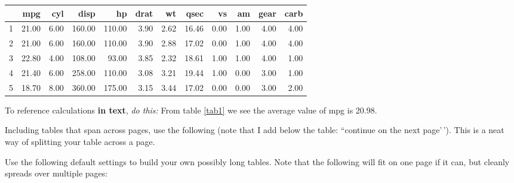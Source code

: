 \documentclass[12pt,preprint, authoryear]{elsarticle}
\let\origtable\table
\let\endorigtable\endtable
\renewenvironment{table}[1][2] {
    \expandafter\origtable\expandafter[H]
} {
    \endorigtable
}
\numberwithin{equation}{section}
\numberwithin{figure}{section}
\numberwithin{table}{section}
\begin{document}
\begin{table}[H]
\centering
\begin{tabular}{rrrrrrrrrrrr}
  \hline
 & mpg & cyl & disp & hp & drat & wt & qsec & vs & am & gear & carb \\ 
  \hline
1 & 21.00 & 6.00 & 160.00 & 110.00 & 3.90 & 2.62 & 16.46 & 0.00 & 1.00 & 4.00 & 4.00 \\ 
  2 & 21.00 & 6.00 & 160.00 & 110.00 & 3.90 & 2.88 & 17.02 & 0.00 & 1.00 & 4.00 & 4.00 \\ 
  3 & 22.80 & 4.00 & 108.00 & 93.00 & 3.85 & 2.32 & 18.61 & 1.00 & 1.00 & 4.00 & 1.00 \\ 
  4 & 21.40 & 6.00 & 258.00 & 110.00 & 3.08 & 3.21 & 19.44 & 1.00 & 0.00 & 3.00 & 1.00 \\ 
  5 & 18.70 & 8.00 & 360.00 & 175.00 & 3.15 & 3.44 & 17.02 & 0.00 & 0.00 & 3.00 & 2.00 \\ 
   \hline
\end{tabular}
\caption{Short Table Example \label{tab1}} 
\end{table}

To reference calculations \textbf{in text}, \emph{do this:} From table
\ref{tab1} we see the average value of mpg is 20.98.

Including tables that span across pages, use the following (note that I
add below the table: ``continue on the next page'\,'). This is a neat
way of splitting your table across a page.

Use the following default settings to build your own possibly long
tables. Note that the following will fit on one page if it can, but
cleanly spreads over multiple pages:
\end{document}
